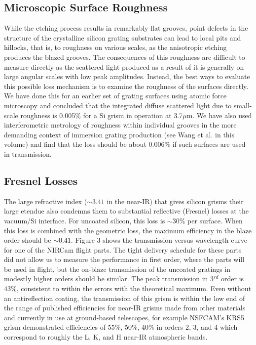 \subsection{Microscopic Surface Roughness}
While the etching process results in remarkably flat grooves, point defects in the structure of the crystalline silicon grating substrates can lead to local pits and hillocks, that is, to roughness on various scales, as the anisotropic etching produces the blazed grooves.  The consequences of this roughness are difficult to measure directly as the scattered light produced as a result of it is generally on large angular scales with low peak amplitudes.  Instead, the best ways to evaluate this possible loss mechanism is to examine the roughness of the surfaces directly.  We have done this for an earlier set of grating surfaces using atomic force microscopy\cite{2007ApOpt..46.3400M} and concluded that the integrated diffuse scattered light due to small-scale roughness is 0.005\% for a Si grism in operation at 3.7$\mu$m.  We have also used interferometric metrology of roughness within individual grooves in the more demanding context of immersion grating production (see Wang et al. in this volume\cite{Wang10}) and find that the loss should be about 0.006\%  if such surfaces are used in transmission.


\subsection{Fresnel Losses}
The large refractive index ($\sim 3.41$ in the near-IR) that gives silicon grisms their large etendue also condemns them to substantial reflective (Fresnel) losses at the vacuum/Si interface.  For uncoated silicon, this loss is $\sim 30\%$ per surface.  When this loss is combined with the geometric loss, the maximum efficiency in the blaze order should be $\sim 0.41$.  Figure 3 shows the transmission versus wavelength curve for one of the NIRCam flight parts.  The tight delivery schedule for these parts did not allow us to measure the performance in first order, where the parts will be used in flight, but the on-blaze transmission of the uncoated gratings in modestly higher orders should be similar.  The peak transmission in 3$^{rd}$ order is 43\%, consistent to within the errors with the theoretical maximum. Even without an antireflection coating, the transmission of this grism is within the low end of the range of published efficiencies for near-IR grisms made from other materials and currently in use at ground-based telescopes, for example NSFCAM's KRS5 grism\cite{Rayner98} demonstrated  efficiencies of 55\%, 50\%, 40\% in orders 2, 3, and 4 which correspond to roughly the L, K, and H near-IR atmospheric bands.  

